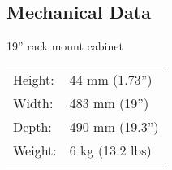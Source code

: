 \subsection{Mechanical Data}
19'' rack mount cabinet

\begin{tabular}{l l}
Height:		& 44 mm (1.73'') \\
Width: 		& 483 mm (19'') \\
Depth:		& 490 mm (19.3'') \\
Weight:		& 6 kg (13.2 lbs) \\
\end{tabular}